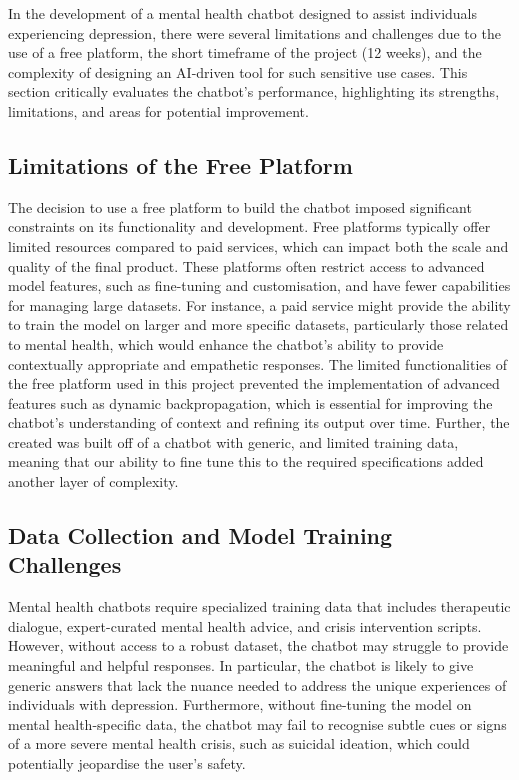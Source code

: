 In the development of a mental health chatbot designed to assist individuals experiencing depression, there were several limitations and challenges due to the use of a free platform, the short timeframe of the project (12 weeks), and the complexity of designing an AI-driven tool for such sensitive use cases. This section critically evaluates the chatbot’s performance, highlighting its strengths, limitations, and areas for potential improvement.
\subsection{Limitations of the Free Platform} 
The decision to use a free platform to build the chatbot imposed significant constraints on its functionality and development. Free platforms typically offer limited resources compared to paid services, which can impact both the scale and quality of the final product. These platforms often restrict access to advanced model features, such as fine-tuning and customisation, and have fewer capabilities for managing large datasets.
For instance, a paid service might provide the ability to train the model on larger and more specific datasets, particularly those related to mental health, which would enhance the chatbot’s ability to provide contextually appropriate and empathetic responses. The limited functionalities of the free platform used in this project prevented the implementation of advanced features such as dynamic backpropagation, which is essential for improving the chatbot’s understanding of context and refining its output over time. Further, the created was built off of a chatbot with generic, and limited training data, meaning that our ability to fine tune this to the required specifications added another layer of complexity.
\subsection{Data Collection and Model Training Challenges} 
Mental health chatbots require specialized training data that includes therapeutic dialogue, expert-curated mental health advice, and crisis intervention scripts. However, without access to a robust dataset, the chatbot may struggle to provide meaningful and helpful responses. In particular, the chatbot is likely to give generic answers that lack the nuance needed to address the unique experiences of individuals with depression. Furthermore, without fine-tuning the model on mental health-specific data, the chatbot may fail to recognise subtle cues or signs of a more severe mental health crisis, such as suicidal ideation, which could potentially jeopardise the user’s safety.
